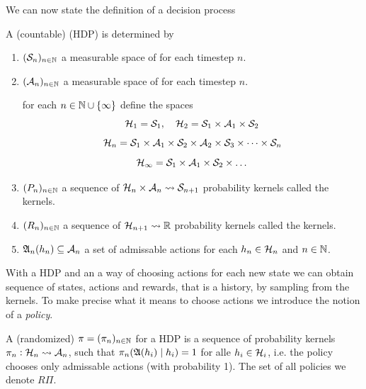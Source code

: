 We can now state the definition of a decision process

\begin{defn}
  A (countable)
   (HDP) is determined by
  \begin{enumerate}
    \item $(\mathcal{S}_n)_{n \in \mathbb{N}}$ a 
      measurable space of  for each timestep $n$.
    \item $(\mathcal{A}_n)_{n \in \mathbb{N}}$ a 
      measurable space of  for each timestep $n$.

      for each $n \in \mathbb{N} \cup \{\infty\}$
      define the  spaces
      \[ \mathcal{H}_1 = \mathcal{S}_1, \quad
      \mathcal{H}_2 = \mathcal{S}_1 \times \mathcal{A}_1\times \mathcal{S}_2 \]
      \[ \mathcal{H}_n = \mathcal{S}_1 \times \mathcal{A}_1
	\times \mathcal{S}_2 \times \mathcal{A}_2
      \times \mathcal{S}_3 \times \dots \times \mathcal{S}_n \]
      \[
	\mathcal{H}_\infty = \mathcal{S}_1 \times \mathcal{A}_1 \times \mathcal{S}_2 \times
	\dots
      \]
    \item $(P_n)_{n \in \mathbb{N}}$ a sequence of
      $\mathcal{H}_n \times \mathcal{A}_n \leadsto \mathcal{S}_{n+1}$ probability kernels
      called the  kernels.
    \item $(R_n)_{n \in \mathbb{N}}$ a sequence of
      $\mathcal{H}_{n+1} \leadsto \mathbb{R}$ probability kernels
      called the  kernels.
    \item $\frak{A}_n(h_n) \subseteq \mathcal{A}_n$ a set of admissable actions
      for each $h_n \in \mathcal{H}_n$ and $n \in \mathbb{N}$.
  \end{enumerate}
  \label{sett:HDP}
\end{defn}

With a HDP and an a way of choosing actions for each new state
we can obtain sequence of states, actions and rewards, that is
a history, by sampling from the kernels.
To make precise what it means to choose actions we introduce the notion
of a \emph{policy}.

\begin{defn}[Policy]
  A (randomized)  $\pi = (\pi_n)_{n \in \mathbb{N}}$ for a
  HDP is a sequence of probability kernels 
  $\pi_n : \mathcal{H}_n \leadsto \mathcal{A}_n$,
  such that $\pi_n(\frak{A}(h_i) \mid h_i) = 1$ for alle $h_i \in \mathcal{H}_i$,
  i.e. the policy chooses only admissable actions (with probability 1).
  The set of all policies we denote $R\Pi$.
\end{defn}

